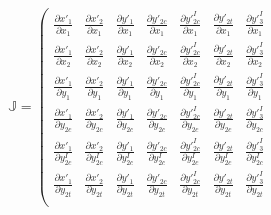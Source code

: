\documentclass{article}
\begin{document}
\begin{equation*}
	\mathbb{J} = \left( \begin{array}{ccccccc}

					\frac{\partial x'_1}{\partial x_1} &
					\frac{\partial x'_2}{\partial x_1} &
					\frac{\partial y'_1}{\partial x_{1}} &
					\frac{\partial y'_{2c}}{\partial x_1} &
					\frac{\partial y'^I_{2c}}{\partial x_1} &
					\frac{\partial y'_{2t}}{\partial x_1} &
					\frac{\partial y'^I_{3}}{\partial x_1} \\[1ex]

					\frac{\partial x'_1}{\partial x_2} &
					\frac{\partial x'_2}{\partial x_2} &
					\frac{\partial y'_1}{\partial x_{2}} &
					\frac{\partial y'_{2c}}{\partial x_2} &
					\frac{\partial y'^I_{2c}}{\partial x_2} &
					\frac{\partial y'_{2t}}{\partial x_2} &
					\frac{\partial y'^I_{3}}{\partial x_2} \\[1ex]

					\frac{\partial x'_1}{\partial y_1} &
					\frac{\partial x'_2}{\partial y_1} &
					\frac{\partial y'_1}{\partial y_{1}} &
					\frac{\partial y'_{2c}}{\partial y_1} &
					\frac{\partial y'^I_{2c}}{\partial y_1} &
					\frac{\partial y'_{2t}}{\partial y_1} &
					\frac{\partial y'^I_{3}}{\partial y_1} \\[1ex]

					\frac{\partial x'_1}{\partial y_{2c}} &
					\frac{\partial x'_2}{\partial y_{2c}} &
					\frac{\partial y'_1}{\partial y_{2c}} &
					\frac{\partial y'_{2c}}{\partial y_{2c}} &
					\frac{\partial y'^I_{2c}}{\partial y_{2c}} &
					\frac{\partial y'_{2t}}{\partial y_{2c}} &
					\frac{\partial y'^I_{3}}{\partial y_{2c}} \\[1ex]

					\frac{\partial x'_1}{\partial y^I_{2c}} &
					\frac{\partial x'_2}{\partial y^I_{2c}} &
					\frac{\partial y'_1}{\partial y^I_{2c}} &
					\frac{\partial y'_{2c}}{\partial y^I_{2c}} &
					\frac{\partial y'^I_{2c}}{\partial y^I_{2c}} &
					\frac{\partial y'_{2t}}{\partial y^I_{2c}} &
					\frac{\partial y'^I_{3}}{\partial y^I_{2c}} \\[1ex]

					\frac{\partial x'_1}{\partial y_{2t}} &
					\frac{\partial x'_2}{\partial y_{2t}} &
					\frac{\partial y'_1}{\partial y_{2t}} &
					\frac{\partial y'_{2c}}{\partial y_{2t}} &
					\frac{\partial y'^I_{2c}}{\partial y_{2t}} &
					\frac{\partial y'_{2t}}{\partial y_{2t}} &
					\frac{\partial y'^I_{3}}{\partial y_{2t}} \\[1ex]


\end{array}
\end{equation*}
\end{document}
